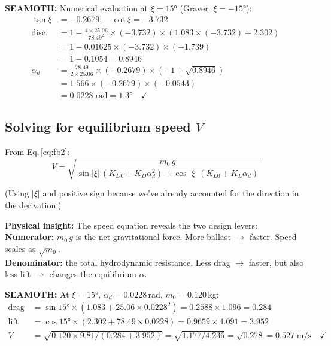 \documentclass[11pt,a4paper]{article}
\newcommand{\note}[1]{\par\smallskip\noindent\colorbox{blue!8}{\parbox{\dimexpr\linewidth-2\fboxsep}{%
  \small\textbf{SEAMOTH:} #1}}\smallskip}
\newcommand{\insight}[1]{\par\smallskip\noindent\colorbox{green!8}{\parbox{\dimexpr\linewidth-2\fboxsep}{%
  \small\textbf{Physical insight:} #1}}\smallskip}
\begin{document}
\note{Numerical evaluation at $\xi=15°$ (Graver: $\xi=-15°$):
\begin{align*}
  \tan\xi &= -0.2679, \quad \cot\xi = -3.732 \\
  \text{disc.} &= 1 - \frac{4\times25.06}{78.49^2}\times(-3.732)\times(1.083\times(-3.732)+2.302) \\
  &= 1 - 0.01625\times(-3.732)\times(-1.739) \\
  &= 1 - 0.1054 = 0.8946 \\
  \alpha_d &= \frac{78.49}{2\times25.06}\times(-0.2679)\times(-1+\sqrt{0.8946}) \\
  &= 1.566\times(-0.2679)\times(-0.0543) \\
  &= 0.0228\;\text{rad} = \mathbf{1.3°} \quad\checkmark
\end{align*}}

\subsection{Solving for equilibrium speed $V$}

From Eq.\,\eqref{eq:fb2}:
\begin{equation}
  \boxed{
    V = \sqrt{\frac{m_0\,g}
    {\sin|\xi|\,(K_{D0}+K_D\alpha_d^2) + \cos|\xi|\,(K_{L0}+K_L\alpha_d)}}
  }
  \label{eq:Vequil}
\end{equation}

(Using $|\xi|$ and positive sign because we've already accounted for the direction
in the derivation.)

\insight{The speed equation reveals the two design levers:\\
\textbf{Numerator:} $m_0\,g$ is the net gravitational force.  More ballast $\rightarrow$ faster.
Speed scales as $\sqrt{m_0}$.\\
\textbf{Denominator:} the total hydrodynamic resistance.  Less drag $\rightarrow$ faster, but
also less lift $\rightarrow$ changes the equilibrium $\alpha$.}

\note{At $\xi=15°$, $\alpha_d=0.0228$\,rad, $m_0=0.120$\,kg:
\begin{align*}
  \text{drag term} &= \sin15°\times(1.083+25.06\times0.0228^2) = 0.2588\times1.096 = 0.284 \\
  \text{lift term} &= \cos15°\times(2.302+78.49\times0.0228) = 0.9659\times4.091 = 3.952 \\
  V &= \sqrt{0.120\times9.81/(0.284+3.952)} = \sqrt{1.177/4.236} = \sqrt{0.278} = \mathbf{0.527}\;\text{m/s} \quad\checkmark
\end{align*}}
\end{document}
